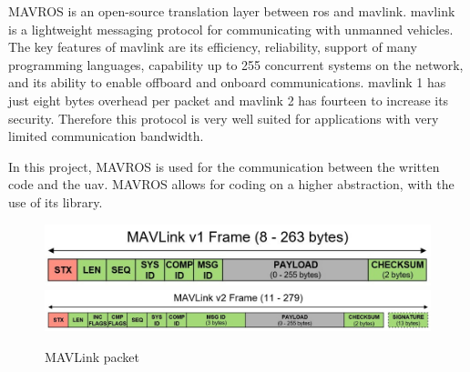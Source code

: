 MAVROS is an open\hyp{}source translation layer between \acs{ros} and \acs{mavlink}. \acs{mavlink} is a lightweight messaging protocol for communicating with unmanned vehicles. The key features of \acs{mavlink} are its efficiency, reliability, support of many programming languages, capability up to 255 concurrent systems on the network, and its ability to enable offboard and onboard communications. \acs{mavlink} 1 has just eight bytes overhead per packet and \acs{mavlink} 2 has fourteen to increase its security. Therefore this protocol is very well suited for applications with very limited communication bandwidth. \cite{mavlink_developer_guide}

In this project, MAVROS is used for the communication between the written code and the \acs{uav}. MAVROS allows for coding on a higher abstraction, with the use of its library.

\begin{figure}[!h]
  \centering
  \includegraphics[width=0.65\linewidth]{images/packet_mavlink_v1.jpg}
  \includegraphics[width=\linewidth]{images/packet_mavlink_v2.jpg}
  \caption{MAVLink packet}
\end{figure}

